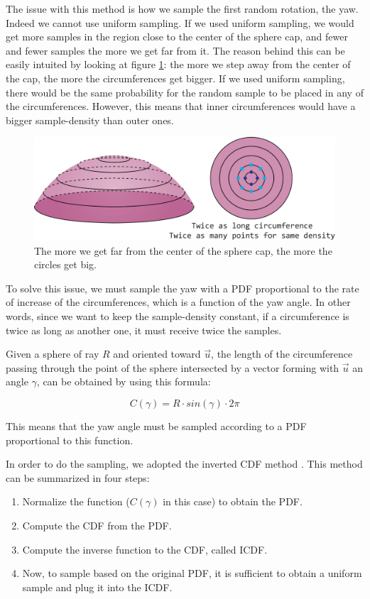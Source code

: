 \documentclass{PoliMi_MasterThesis}
\begin{document}
The issue with this method is how we sample the first random rotation, the yaw. Indeed we cannot use uniform sampling. If we used uniform sampling, we would get more samples in the region close to the center of the sphere cap, and fewer and fewer samples the more we get far from it. The reason behind this can be easily intuited by looking at figure \ref{fig:concentric_circles}: the more we step away from the center of the cap, the more the circumferences get bigger. If we used uniform sampling, there would be the same probability for the random sample to be placed in any of the circumferences. However, this means that inner circumferences would have a bigger sample-density than outer ones.

\begin{figure}[H]
    \centering
    \includegraphics[width=\textwidth*\real{0.65}]{Images/sphere_cap_density.png} 
    \caption{The more we get far from the center of the sphere cap, the more the circles get big.}
    \label{fig:concentric_circles}
\end{figure}

To solve this issue, we must sample the yaw with a PDF proportional to the rate of increase of the circumferences, which is a function of the yaw angle. In other words, since we want to keep the sample-density constant, if a circumference is twice as long as another one, it must receive twice the samples.

Given a sphere of ray $R$ and oriented toward $\overrightarrow{u}$, the length of the circumference passing through the point of the sphere intersected by a vector forming with $\overrightarrow{u}$ an angle $\gamma$, can be obtained by using this formula:

$$C(\gamma) = R \cdot sin(\gamma) \cdot 2\pi$$

This means that the yaw angle must be sampled according to a PDF proportional to this function.

In order to do the sampling, we adopted the inverted CDF method \cite{TODO}. This method can be summarized in four steps:
\begin{enumerate}
	\item Normalize the function ($C(\gamma)$ in this case) to obtain the PDF.
	\item Compute the CDF from the PDF.
	\item Compute the inverse function to the CDF, called ICDF.
	\item Now, to sample based on the original PDF, it is sufficient to obtain a uniform sample and plug it into the ICDF.
\end{enumerate}
\end{document}
